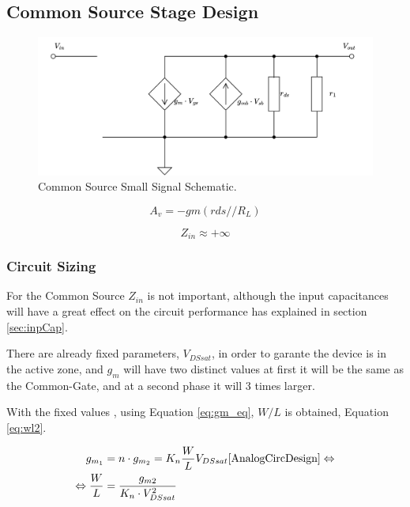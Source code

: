 \subsection{Common Source Stage Design}


\begin{figure}[H]
    \centering
    \includegraphics[width=1\textwidth]{Images/CS_SmallSig.png}
    \caption{Common Source Small Signal Schematic.}
    \label{fig:CS_SmallSignal}
\end{figure}

\begin{equation}
    A_v = -gm(rds//R_L)
    \label{eq:CS_Gain}
\end{equation}

\begin{equation}
    Z_{in} \approx +\infty
    \label{eq:CS_Zin}
\end{equation}

\subsubsection{Circuit Sizing}

For the Common Source $Z_{in}$ is not important, although the input capacitances will have a great effect on the circuit performance has explained in section \ref{sec:inpCap}. 

There are already fixed parameters, $V_{DSsat}$, in order to garante the device is in the active zone, and $g_{m}$ will have two distinct values at first it will be the same as the Common-Gate, and at a second phase it will 3 times larger. 

With the fixed values , using Equation \ref{eq:gm_eq}, $W/L$ is obtained, Equation \ref{eq:wl2}. 

\begin{equation}
    \begin{split}
        g_{m_1} &= n\cdot g_{m_2} = K_{n}\frac{W}{L}V_{DSsat}\text{\cite{AnalogCircDesign}} \Leftrightarrow \\
       \Leftrightarrow \frac{W}{L} &= \frac{g_{m2}}{K_n \cdot V_{DSsat}^2}
    \end{split}
    \label{eq:wl2}
\end{equation}

